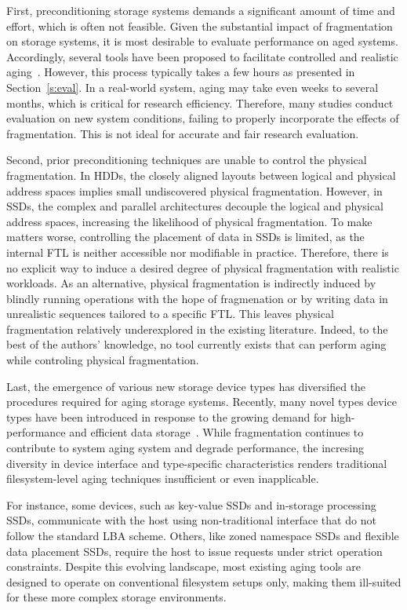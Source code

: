 First, preconditioning storage systems demands a significant amount of time and effort, which is often not feasible.
Given the substantial impact of fragmentation on storage systems, it is most desirable to evaluate performance on aged systems.
Accordingly, several tools have been proposed to facilitate controlled and realistic aging~\cite{tools,studies}.
However, this process typically takes a few hours as presented in Section~\ref{s:eval}.
In a real-world system, aging may take even weeks to several months, which is critical for research efficiency.
Therefore, many studies conduct evaluation on new system conditions, failing to properly incorporate the effects of fragmentation.
This is not ideal for accurate and fair research evaluation.

Second, prior preconditioning techniques are unable to control the physical fragmentation.
In HDDs, the closely aligned layouts between logical and physical address spaces implies small undiscovered physical fragmentation.
However, in SSDs, the complex and parallel architectures decouple the logical and physical address spaces, increasing the likelihood of physical fragmentation.
To make matters worse, controlling the placement of data in SSDs is limited, as the internal FTL is neither accessible nor modifiable in practice.
Therefore, there is no explicit way to induce a desired degree of physical fragmentation with realistic workloads.
As an alternative, physical fragmentation is indirectly induced by blindly running operations with the hope of fragmenation or by writing data in unrealistic sequences tailored to a specific FTL.
This leaves physical fragmentation relatively underexplored in the existing literature.
Indeed, to the best of the authors' knowledge, no tool currently exists that can perform aging while controling physical fragmentation.

Last, the emergence of various new storage device types has diversified the procedures required for aging storage systems.
Recently, many novel types device types have been introduced in response to the growing demand for high-performance and efficient data storage~\cite{NEEDED,NEEDED,NEEDED}.
While fragmentation continues to contribute to system aging system and degrade performance, the incresing diversity in device interface and type-specific characteristics renders traditional filesystem-level aging techniques insufficient or even inapplicable.

For instance, some devices, such as key-value SSDs and in-storage processing SSDs, communicate with the host using non-traditional interface that do not follow the standard LBA scheme.
Others, like zoned namespace SSDs and flexible data placement SSDs, require the host to issue requests under strict operation constraints.
Despite this evolving landscape, most existing aging tools are designed to operate on conventional filesystem setups only, making them ill-suited for these more complex storage environments.


